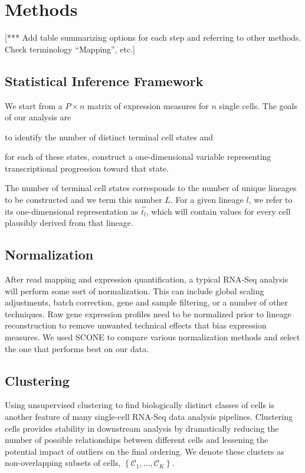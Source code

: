 \documentclass[11pt]{article}\usepackage[]{graphicx}\usepackage[]{color}
\begin{document}
\section{Methods}

[*** Add table summarizing options for each step and referring to other methods. Check terminology ``Mapping'', etc.]

\subsection{Statistical Inference Framework}
We start from a $P \times n$ matrix of expression measures for $n$ single cells. The goals of our analysis are 
\begin{enumerate*}[font={\bfseries}]
\item to identify the number of distinct terminal cell states and
\item for each of these states, construct a one-dimensional variable representing transcriptional progression toward that state.
\end{enumerate*}
The number of terminal cell states corresponds to the number of unique lineages to be constructed and we term this number $L$. For a given lineage $l$, we refer to its one-dimensional representation as $\hat{t_l}$, which will contain values for every cell plausibly derived from that lineage.

\subsection{Normalization}
After read mapping and expression quantification, a typical RNA-Seq analysis will perform some sort of normalization. This can include global scaling adjustments, batch correction, gene and sample filtering, or a number of other techniques. Raw gene expression profiles need to be normalized prior to lineage reconstruction to remove unwanted technical effects that bias expression measures. We used SCONE to compare various normalization methods and select the one that performs best on our data.

\subsection{Clustering}
Using unsupervised clustering to find biologically distinct classes of cells is another feature of many single-cell RNA-Seq data analysis pipelines. Clustering cells provides stability in downstream analysis by dramatically reducing the number of possible relationships between different cells and lessening the potential impact of outliers on the final ordering. We denote these clusters as non-overlapping subsets of cells, $\left\{\mathcal{C}_1,\dots,\mathcal{C}_K\right\}$.
\end{document}
